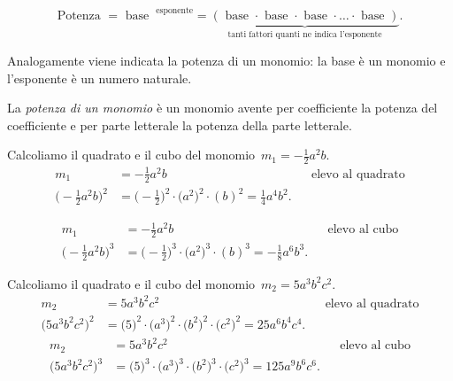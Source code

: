 \[\text{Potenza }=\text{ base }^\text{ esponente}= \underbrace{(\text{ base }\cdot \text{ base }\cdot\text{ base }\cdot\ldots\cdot \text{ base })}_{\text{tanti fattori quanti ne indica l'esponente}}.\]

Analogamente viene indicata la potenza di un monomio: la base è un
monomio e l'esponente è un numero naturale.

\begin{definizione}
La \emph{potenza di un monomio} è un monomio
avente per coefficiente la potenza del coefficiente e per parte
letterale la potenza della parte letterale.
\end{definizione}

\begin{exrig}
 \begin{esempio}
Calcoliamo il quadrato e il cubo del monomio~$m_{1}=-{\frac{1}{2}}a^{2}b$.
\begin{align*}
m_{1}&=-{\frac{1}{2}}a^{2}b && \text{elevo al quadrato}\\
\bigg(-{\frac{1}{2}}a^{2}b\bigg)^{2}
&=\bigg(-{\frac{1}{2}}\bigg)^{2}\cdot\big(a^{2}\big)^{2}\cdot (b)^{2}
=\frac{1}{4}a^{4}b^{2}.
\end{align*}

\begin{align*}
m_{1}&=-{\frac{1}{2}}a^{2}b &&\text{elevo al cubo}\\
\bigg(-{\frac{1}{2}}a^{2}b\bigg)^{3}
&=\bigg(-{\frac{1}{2}}\bigg)^{3}\cdot\big(a^{2}\big)^{3}\cdot (b)^{3}
=-{\frac{1}{8}}a^{6}b^{3}.
\end{align*}
 \end{esempio}

 \begin{esempio}
Calcoliamo il quadrato e il cubo del monomio~$m_{2}=5a^{3}b^{2}c^{2}$.
\begin{align*}
m_{2}&=5a^{3}b^{2}c^{2} &&\text{elevo al quadrato}\\
\big(5a^{3}b^{2}c^{2}\big)^{2}
&=\big(5\big)^{2}\cdot \big(a^{3}\big)^{2}\cdot\big(b^{2}\big)^{2}\cdot \big(c^{2}\big)^{2}
=25a^{6}b^{4}c^{4}.
\end{align*}
\begin{align*}
m_{2}&=5a^{3}b^{2}c^{2} &&\text{elevo al cubo}\\
\big(5a^{3}b^{2}c^{2}\big)^{3}
&=\big(5\big)^{3}\cdot \big(a^{3}\big)^{3}\cdot\big(b^{2}\big)^{3}\cdot \big(c^{2}\big)^{3}
=125a^{9}b^{6}c^{6}.
\end{align*}
 \end{esempio}
\end{exrig}

